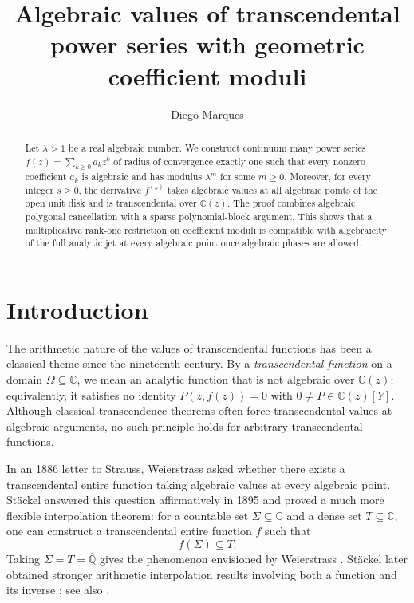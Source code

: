 \documentclass[10pt]{amsart}
\title[Transcendental power series with geometric coefficient moduli]
{Algebraic values of transcendental power series with geometric coefficient moduli}
\author{Diego Marques}
\theoremstyle{definition}
\theoremstyle{remark}
\numberwithin{equation}{section}
\newcommand{\C}{\mathbb C}
\newcommand{\Qbar}{\overline{\mathbb Q}}
\begin{document}
\begin{abstract}
Let $\lambda>1$ be a real algebraic number. We construct continuum many
power series $f(z)=\sum_{k\geq0}a_kz^k$ of radius of convergence exactly
one such that every nonzero coefficient $a_k$ is algebraic and has modulus
$\lambda^m$ for some $m\geq0$. Moreover, for every integer $s\geq0$, the derivative $f^{(s)}$ takes
algebraic values at all algebraic points of the open unit disk and is
transcendental over $\C(z)$. The proof combines algebraic polygonal cancellation with a sparse
polynomial-block argument. This shows that a multiplicative rank-one
restriction on coefficient moduli is compatible with algebraicity of
the full analytic jet at every algebraic point once algebraic phases
are allowed.
\end{abstract}

\maketitle

\section{Introduction}

The arithmetic nature of the values of transcendental functions has been a
classical theme since the nineteenth century. By a \emph{transcendental
function} on a domain $\Omega\subseteq\C$, we mean an analytic function that
is not algebraic over $\C(z)$; equivalently, it satisfies no identity
$P(z,f(z))=0$ with $0\neq P\in\C(z)[Y]$. Although classical transcendence
theorems often force transcendental values at algebraic arguments, no such
principle holds for arbitrary transcendental functions.

In an 1886 letter to Strauss, Weierstrass asked whether there exists a
transcendental entire function taking algebraic values at every algebraic
point. St\"ackel answered this question affirmatively in 1895 and proved a
much more flexible interpolation theorem: for a countable set
$\Sigma\subseteq\C$ and a dense set $T\subseteq\C$, one can construct a
transcendental entire function $f$ such that
\[
        f(\Sigma)\subseteq T.
\]
Taking $\Sigma=T=\Qbar$ gives the phenomenon envisioned by Weierstrass
\cite{stackel1895,waldschmidt2003}. St\"ackel later obtained stronger
arithmetic interpolation results involving both a function and its inverse
\cite{stackel1902}; see also
\cite{huangmarquesmereb2010, vanderpoorten1968,waldschmidt2003}.
\end{document}
